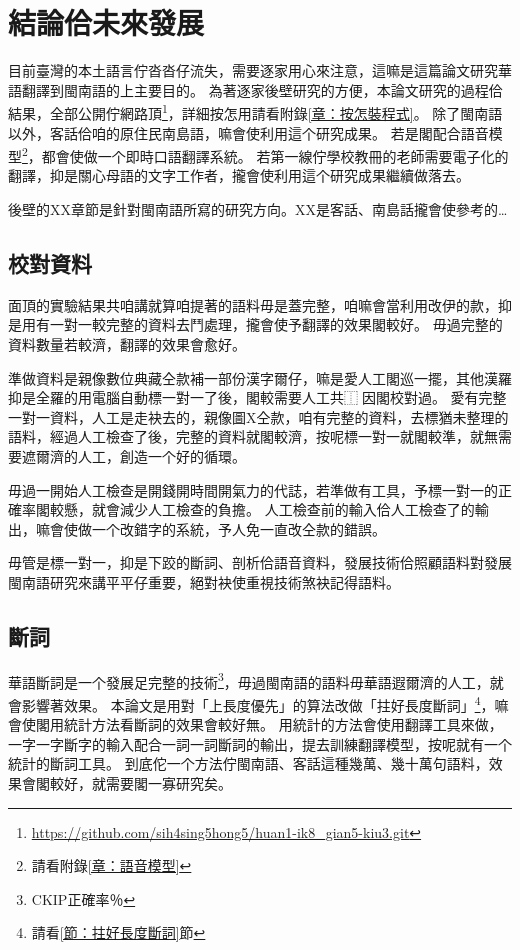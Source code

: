 \documentclass[final,oneside,onecolumn,12pt,a4paper]{book}%
\begin{document}
\chapter{結論佮未來發展}
\label{章：結論佮未來發展}
目前臺灣的本土語言佇沓沓仔流失，需要逐家用心來注意，這嘛是這篇論文研究華語翻譯到閩南語的上主要目的。
為著逐家後壁研究的方便，本論文研究的過程佮結果，全部公開佇網路頂\footnote{\url{https://github.com/sih4sing5hong5/huan1-ik8_gian5-kiu3.git}}，詳細按怎用請看附錄\ref{章：按怎裝程式}。
除了閩南語以外，客話佮咱的原住民南島語，嘛會使利用這个研究成果。
若是閣配合語音模型\footnote{請看附錄\ref{章：語音模型}}，都會使做一个即時口語翻譯系統。
若第一線佇學校教冊的老師需要電子化的翻譯，抑是關心母語的文字工作者，攏會使利用這个研究成果繼續做落去。

後壁的XX章節是針對閩南語所寫的研究方向。XX是客話、南島話攏會使參考的…
\section{校對資料}
\label{節：校對資料}
面頂的實驗結果共咱講就算咱提著的語料毋是蓋完整，咱嘛會當利用改伊的款，抑是用有一對一較完整的資料去鬥處理，攏會使予翻譯的效果閣較好。
毋過完整的資料數量若較濟，翻譯的效果會愈好。

準做資料是親像數位典藏仝款補一部份漢字爾仔，嘛是愛人工閣巡一擺，其他漢羅抑是全羅的用電腦自動標一對一了後，閣較需要人工共⿰因閣校對過。
愛有完整一對一資料，人工是走袂去的，親像圖X仝款，咱有完整的資料，去標猶未整理的語料，經過人工檢查了後，完整的資料就閣較濟，按呢標一對一就閣較準，就無需要遮爾濟的人工，創造一个好的循環。

毋過一開始人工檢查是開錢開時間開氣力的代誌，若準做有工具，予標一對一的正確率閣較懸，就會減少人工檢查的負擔。
人工檢查前的輸入佮人工檢查了的輸出，嘛會使做一个改錯字的系統，予人免一直改仝款的錯誤。

毋管是標一對一，抑是下跤的斷詞、剖析佮語音資料，發展技術佮照顧語料對發展閩南語研究來講平平仔重要，絕對袂使重視技術煞袂記得語料。

\section{斷詞}
\label{節：未來斷詞}
華語斷詞是一个發展足完整的技術\footnote{CKIP正確率％}，毋過閩南語的語料毋華語遐爾濟的人工，就會影響著效果。
本論文是用對「上長度優先」的算法改做「拄好長度斷詞」\footnote{請看\ref{節：拄好長度斷詞}節}，嘛會使閣用統計方法看斷詞的效果會較好無。
用統計的方法會使用翻譯工具來做，一字一字斷字的輸入配合一詞一詞斷詞的輸出，提去訓練翻譯模型，按呢就有一个統計的斷詞工具。
到底佗一个方法佇閩南語、客話這種幾萬、幾十萬句語料，效果會閣較好，就需要閣一寡研究矣。
\end{document}
